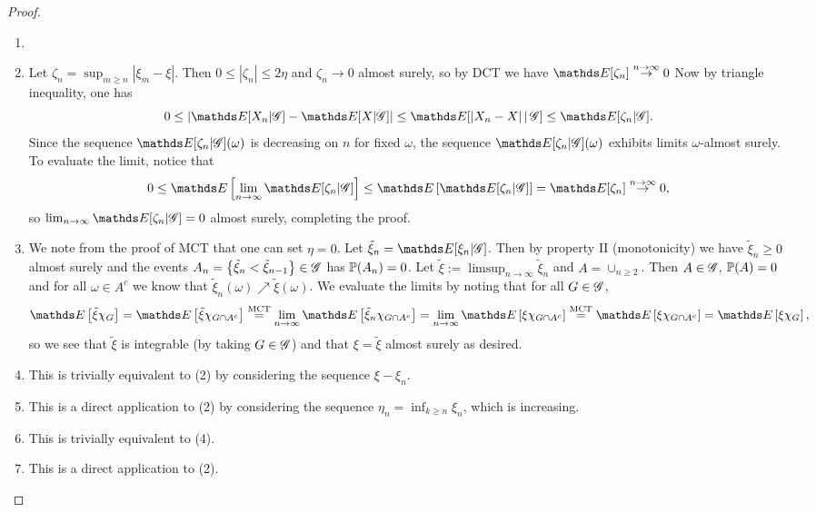 \begin{proof}
\begin{enumerate}
\item[]
\item Let $\zeta_n = \sup_{m\geq n} |\xi_m - \xi|$. Then $0 \leq |\zeta_n| \leq 2\eta$ and $\zeta_n \to 0$ almost surely, so by DCT we have $\E[\zeta_n] \overset{n\to\infty}\to 0$ Now by triangle inequality, one has 
\begin{equation*}
0 \leq \abs{\E[X_n|\G] - \E[X|\G]} \leq \E[|X_n-X| \,|\, \G] \leq \E[\zeta_n|\G].
\end{equation*}
Since the sequence $\E[\zeta_n|\G](\omega)$ is decreasing on $n$ for fixed $\omega$, the sequence $\E[\zeta_n|\G](\omega)$ exhibits limits $\omega$-almost surely. To evaluate the limit, notice that
\begin{equation*}
0 \leq \E\sqbracket{\lim_{n\to\infty} \E[\zeta_n|\G]} \leq \E\sqbracket{\E[\zeta_n|\G]} = \E[\zeta_n] \overset{n\to\infty}\to 0,
\end{equation*}
so $\lim_{n\to\infty} \E[\zeta_n|\G] = 0$ almost surely, completing the proof.
\item We note from the proof of MCT that one can set $\eta = 0$. Let $\tilde{\xi}_n = \E[\xi_n|\G]$. Then by property II (monotonicity) we have $\tilde{\xi}_n \geq 0$ almost surely and the events $A_n = \left\{ \tilde{\xi}_n < \tilde{\xi}_{n-1} \right \} \in \mathcal{G}$ has $\mathbb{P}(A_n) = 0$. Let $\tilde{\xi} := \limsup_{n\to\infty} \tilde{\xi}_n$ and $A = \cup_{n\geq 2}$. Then $A \in \mathcal{G}$, $\mathbb{P}(A) = 0$ and for all $\omega \in A^c$ we know that $\tilde{\xi}_n(\omega) \nearrow \tilde{\xi}(\omega)$. We evaluate the limits by noting that for all $G \in \mathcal{G}$,
\begin{equation*}
    \E\sqbracket{\tilde{\xi} \chi_G} = \E\sqbracket{\tilde{\xi}\chi_{G \cap A^c}} \overset{\text{MCT}}= \lim_{n\to\infty} \E\sqbracket{\tilde{\xi}_n \chi_{G \cap A^c}} = \lim_{n\to\infty} \E\sqbracket{\xi \chi_{G \cap A^c}} \overset{\text{MCT}} = \E\sqbracket{\xi\chi_{G \cap A^c}} = \E\sqbracket{\xi\chi_{G}},
\end{equation*}
so we see that $\tilde{\xi}$ is integrable (by taking $G \in \mathcal{G}$) and that $\xi = \tilde{\xi}$ almost surely as desired.
\item This is trivially equivalent to (2) by considering the sequence $\xi - \xi_n$.
\item This is a direct application to (2) by considering the sequence $\eta_n = \inf_{k\geq n} \xi_n$, which is increasing.
\item This is trivially equivalent to (4).
\item This is a direct application to (2).
\end{enumerate}
\end{proof}

